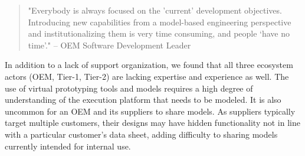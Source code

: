 \begin{quote}
"Everybody is always focused on the 'current' development objectives.
Introducing new capabilities from a model-based engineering perspective and institutionalizing them is very time consuming, and people ‘have no time’." 
-- OEM Software Development Leader
\end{quote}

In addition to a lack of  support organization, we found that all three ecosystem actors (OEM, Tier-1, Tier-2) are lacking expertise and experience as well.
The use of virtual prototyping tools and models requires a high degree of understanding of the execution platform that needs to be modeled.
%
%
It is also uncommon for an OEM and its suppliers to share models.
As suppliers typically target multiple customers, their designs may have hidden functionality not in line with a particular customer’s data sheet,
adding difficulty to sharing models currently intended for internal use.



